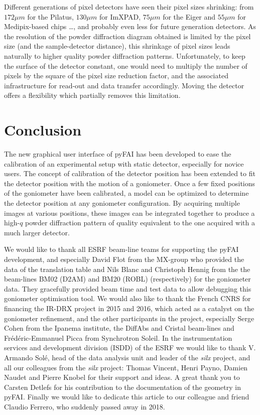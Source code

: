 \documentclass[preprint]{iucr}              %
\begin{document}
Different generations of pixel detectors have seen their pixel sizes
shrinking:
from $172 \mu m$ for the Pilatus, $130 \mu m$ for ImXPAD, $75 \mu m$ for the
Eiger and $55 \mu m$ for Medipix-based chips \ldots, and probably even less for
future generation detectors.
As the resolution of the powder diffraction diagram obtained is limited by the
pixel size (and the sample-detector distance), this shrinkage of
pixel sizes leads naturally to higher quality powder
diffraction patterns.
Unfortunately, to keep the surface of the detector constant, one would need
to multiply the number of pixels by the square of the pixel size reduction
factor, and the associated infrastructure for read-out and data transfer
accordingly.
Moving the detector offers a flexibility which partially removes this
limitation.

\section{Conclusion}

The new graphical user interface of pyFAI has been developed to ease the
calibration of an experimental setup with static detector, especially for
novice users.
The concept of calibration of the detector position has been extended to fit
the detector position with the motion of a goniometer.   
Once a few fixed positions of the goniometer have been calibrated, a model can
be optimized to determine the detector position at any goniometer
configuration.
By acquiring multiple images at various positions, these images can be
integrated together to produce a high-$q$ powder diffraction pattern of
quality equivalent to the one acquired with a much larger detector. 
 

We would like to thank all ESRF beam-line teams for supporting the
pyFAI development, and especially David Flot from the MX-group who provided the
data of the translation table and Nils Blanc and Christoph Hennig from the the
beam-lines BM02 (D2AM) and BM20 (ROBL) (respectively) for the goniometer data. 
They gracefully provided beam time and test data to allow debugging this 
goniometer optimisation tool.
We would also like to thank the French CNRS for financing the IR-DRX project
in 2015 and 2016, which acted as a catalyst on the goniometer refinement,
and the other participants in the project, especially Serge Cohen from the
Ipanema institute, the DiffAbs and Cristal beam-lines and Frédéric-Emmanuel Picca 
from Synchrotron Soleil.
In the instrumentation services and development division (ISDD) of the ESRF  we
would like to thank V. Armando Solé, head of the data analysis unit and leader of 
the \textit{silx} project, and all our colleagues from the \textit{silx}
project:
Thomas Vincent, Henri Payno, Damien Naudet and  Pierre Knobel for their support and ideas. 
A great thank you to Carsten Detlefs for his contribution to the documentation of the geometry in pyFAI. 
Finally we would like to dedicate this article to our colleague and friend Claudio Ferrero, who suddenly passed away in 2018. 



\end{document}

